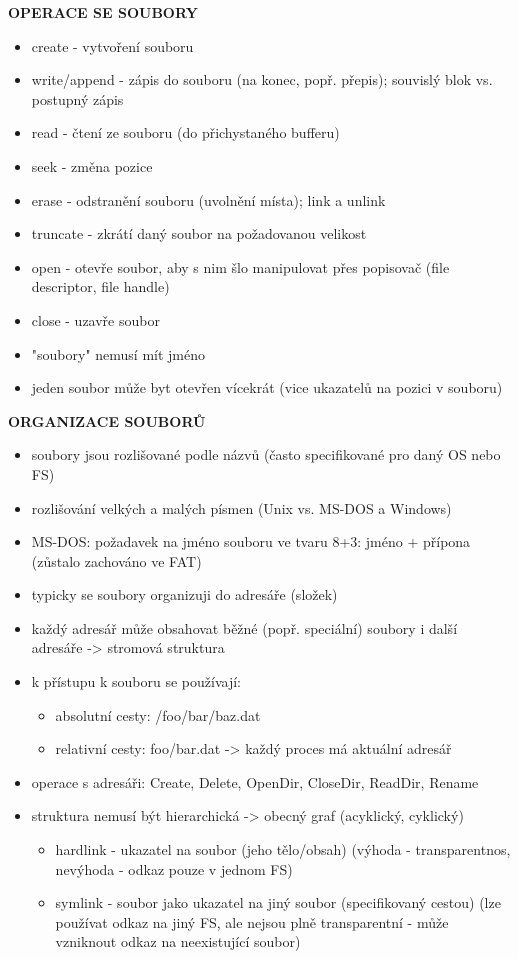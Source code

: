 \documentclass[10pt,a4paper]{article}
\begin{document}
\textbf{OPERACE SE SOUBORY}
\begin{itemize}
	\item create - vytvoření souboru
	\item write/append - zápis do souboru (na konec, popř. přepis); souvislý blok vs. postupný zápis
	\item read - čtení ze souboru (do přichystaného bufferu)
	\item seek - změna pozice
	\item erase - odstranění souboru (uvolnění místa); link a unlink
	\item truncate - zkrátí daný soubor na požadovanou velikost
	\item open - otevře soubor, aby s nim šlo manipulovat přes popisovač (file descriptor, file handle)
	\item close - uzavře soubor
	\item "soubory" nemusí mít jméno
	\item jeden soubor může byt otevřen vícekrát (vice ukazatelů na pozici v souboru)
\end{itemize}

\textbf{ORGANIZACE SOUBORŮ}
\begin{itemize}
	\item soubory jsou rozlišované podle názvů (často specifikované pro daný OS nebo FS)
	\item rozlišování velkých a malých písmen (Unix vs. MS-DOS a Windows)
	\item MS-DOS: požadavek na jméno souboru ve tvaru 8+3: jméno + přípona (zůstalo zachováno
ve FAT)
	\item typicky se soubory organizuji do adresáře (složek)
	\item každý adresář může obsahovat běžné (popř. speciální) soubory i další adresáře -> stromová
struktura
	\item k přístupu k souboru se používají:
	\begin{itemize}
		\item absolutní cesty: /foo/bar/baz.dat
		\item relativní cesty: foo/bar.dat -> každý proces má aktuální adresář
	\end{itemize}
	\item operace s adresáři: Create, Delete, OpenDir, CloseDir, ReadDir, Rename
	\item struktura nemusí být hierarchická -> obecný graf (acyklický, cyklický)
	\begin{itemize}
		\item hardlink - ukazatel na soubor (jeho tělo/obsah) (výhoda - transparentnos, nevýhoda
- odkaz pouze v jednom FS)
		\item symlink - soubor jako ukazatel na jiný soubor (specifikovaný cestou) (lze používat
odkaz na jiný FS, ale nejsou plně transparentní - může vzniknout odkaz na neexistující
soubor)
	\end{itemize}
\end{itemize}
\end{document}
